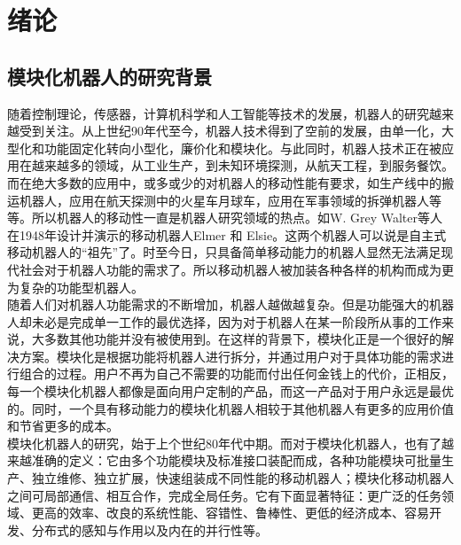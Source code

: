 
\chapter{绪论}
\label{chap:introduction}

\section{模块化机器人的研究背景}

随着控制理论，传感器，计算机科学和人工智能等技术的发展，机器人的研究越来越受到关注。从上世纪90年代至今，机器人技术得到了空前的发展，由单一化，大型化和功能固定化转向小型化，廉价化和模块化。与此同时，机器人技术正在被应用在越来越多的领域，从工业生产，到未知环境探测，从航天工程，到服务餐饮。而在绝大多数的应用中，或多或少的对机器人的移动性能有要求，如生产线中的搬运机器人，应用在航天探测中的火星车月球车，应用在军事领域的拆弹机器人等等。所以机器人的移动性一直是机器人研究领域的热点。如W. Grey Walter等人在1948年设计并演示的移动机器人Elmer 和 Elsie。这两个机器人可以说是自主式移动机器人的“祖先”了。时至今日，只具备简单移动能力的机器人显然无法满足现代社会对于机器人功能的需求了。所以移动机器人被加装各种各样的机构而成为更为复杂的功能型机器人。 \\

随着人们对机器人功能需求的不断增加，机器人越做越复杂。但是功能强大的机器人却未必是完成单一工作的最优选择，因为对于机器人在某一阶段所从事的工作来说，大多数其他功能并没有被使用到。在这样的背景下，模块化正是一个很好的解决方案。模块化是根据功能将机器人进行拆分，并通过用户对于具体功能的需求进行组合的过程。用户不再为自己不需要的功能而付出任何金钱上的代价，正相反，每一个模块化机器人都像是面向用户定制的产品，而这一产品对于用户永远是最优的。同时，一个具有移动能力的模块化机器人相较于其他机器人有更多的应用价值和节省更多的成本。 \\

模块化机器人的研究，始于上个世纪80年代中期。而对于模块化机器人，也有了越来越准确的定义：它由多个功能模块及标准接口装配而成，各种功能模块可批量生产、独立维修、独立扩展，快速组装成不同性能的移动机器人；模块化移动机器人之间可局部通信、相互合作，完成全局任务。它有下面显著特征：更广泛的任务领域、更高的效率、改良的系统性能、容错性、鲁棒性、更低的经济成本、容易开发、分布式的感知与作用以及内在的并行性等。  \\

